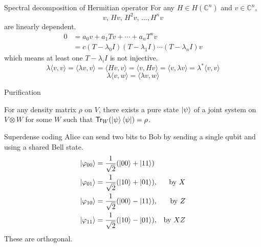 \documentclass[10pt]{beamer}
\newcommand{\Tr}{\mathsf{Tr}}
\newcommand\emm[1]{\textcolor{redorange}{{#1}}}
\begin{document}
\begin{frame}{Spectral decomposition of Hermitian operator}
For any $H\in H(\mathbb{C}^n)$ and $v\in \mathbb{C}^n$,
\begin{equation*}
v,\, Hv,\, H^2v,\,\dotsc,H^nv
\end{equation*}
are linearly dependent.
\begin{align*}
0 &= a_0v+a_1 Tv+\dotsb+a_nT^nv\\
 &= c(T-\lambda_0 I)(T-\lambda_1 I)\dotsm(T-\lambda_n I)v
\end{align*}
which means at least one $T-\lambda_i I$ is not injective.
\begin{equation*}
\lambda \langle v, v\rangle
=\langle \lambda v, v\rangle
=\langle H v, v\rangle
=\langle v, H v\rangle
=\langle v, \lambda v\rangle
=\lambda^* \langle v, v\rangle
\end{equation*}
\begin{equation*}
\lambda \langle v, w\rangle
=\langle \lambda v, w\rangle
\end{equation*}

\end{frame}

\begin{frame}{Purification}
\begin{theorem}
For any density matrix $\rho$ on $V$, there exists a pure state $\ket{\psi}$ of a joint system on $V\otimes W$ for some $W$ such that $\Tr_W(\ket{\psi}\bra{\psi})=\rho$.
\end{theorem}
\end{frame}
\fi

\begin{frame}{Superdense coding}
Alice can send \emm{two} bits to Bob by sending a single qubit and using a shared Bell state.
\begin{align*}
\ket{\varphi_{00}} &= \frac1{\sqrt{2}}(\ket{00}+\ket{11})\\
\ket{\varphi_{01}} &= \frac1{\sqrt{2}}(\ket{10}+\ket{01}),& \text{by $X$}\\
\ket{\varphi_{10}} &= \frac1{\sqrt{2}}(\ket{00}-\ket{11}),& \text{by $Z$}\\
\ket{\varphi_{11}} &= \frac1{\sqrt{2}}(\ket{10}-\ket{01}),& \text{by $XZ$}\\
\end{align*}
These are \emm{orthogonal}.
\end{frame}
\fi
\end{document}
